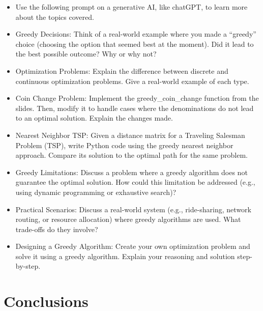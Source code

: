\documentclass[
  letterpaper,
  DIV=11,
  numbers=noendperiod]{scrreprt}
\providecommand{\tightlist}{%
  \setlength{\itemsep}{0pt}\setlength{\parskip}{0pt}}\usepackage{longtable,booktabs,array}
\begin{document}
\begin{itemize}
\tightlist
\item
  Use the following prompt on a generative AI, like chatGPT, to learn
  more about the topics covered.
\item
  Greedy Decisions: Think of a real-world example where you made a
  ``greedy'' choice (choosing the option that seemed best at the
  moment). Did it lead to the best possible outcome? Why or why not?
\item
  Optimization Problems: Explain the difference between discrete and
  continuous optimization problems. Give a real-world example of each
  type.
\item
  Coin Change Problem: Implement the greedy\_coin\_change function from
  the slides. Then, modify it to handle cases where the denominations do
  not lead to an optimal solution. Explain the changes made.
\item
  Nearest Neighbor TSP: Given a distance matrix for a Traveling Salesman
  Problem (TSP), write Python code using the greedy nearest neighbor
  approach. Compare its solution to the optimal path for the same
  problem.
\item
  Greedy Limitations: Discuss a problem where a greedy algorithm does
  not guarantee the optimal solution. How could this limitation be
  addressed (e.g., using dynamic programming or exhaustive search)?
\item
  Practical Scenarios: Discuss a real-world system (e.g., ride-sharing,
  network routing, or resource allocation) where greedy algorithms are
  used. What trade-offs do they involve?
\item
  Designing a Greedy Algorithm: Create your own optimization problem and
  solve it using a greedy algorithm. Explain your reasoning and solution
  step-by-step.
\end{itemize}


\chapter{Conclusions}\label{conclusions-1}
\end{document}
